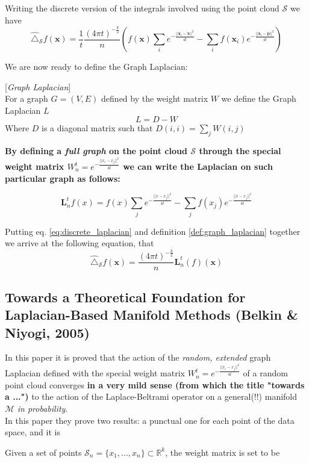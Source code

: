 Writing the discrete version of the integrals involved using the point cloud $\mathcal S$ we have
\begin{equation}\label{eq:discrete_laplacian}
	\hat \triangle_\mathcal S f(\mathbf x) =  \frac{1}{t} \frac{(4\pi t)^{-\frac{k}{2}}}{n}\left( f(\mathbf x)\sum_{i} e^{-\frac{||\mathbf x_i - \mathbf x||^2}{4t}} - \sum_{i} f(\mathbf x_i) e^{-\frac{||\mathbf x_i - \mathbf p||^2}{4t}}\right)
\end{equation}

We are now ready to define the Graph Laplacian:
\begin{definition}{[\textit{Graph Laplacian}]}\\
	For a graph $G = (V, E)$ defined by the weight matrix $W$ we define the Graph Laplacian $L$
	$$L = D-W$$
	Where $D$ is a diagonal matrix such that $D(i,i) = \sum_j W(i,j)$	
	\label{def:graph_laplacian}
\end{definition}
\textbf{By defining a \textit{full graph} on the point cloud $\mathcal S$ through the special weight matrix $W_n^t  = e^{-\frac{||x_i-x_j||^2}{4t}}$ we can write the Laplacian on such particular graph as follows:}
	
$$\mathbf L_n^tf(x) = f(x)\sum_{j}e^{-\frac{||x-x_j||^2}{4t}} - \sum_jf(x_j)e^{-\frac{||x-x_j||^2}{4t}}$$
	
Putting eq. \ref{eq:discrete_laplacian} and definition \ref{def:graph_laplacian} together we arrive at the following equation, that 
$$\hat \triangle_\mathcal S f(\mathbf x) =  \frac{(4\pi t)^{-\frac{k}{2}}}{n} \mathbf L_n^t(f)(\mathbf x)$$



\subsection{Towards a Theoretical Foundation for Laplacian-Based Manifold Methods (Belkin \& Niyogi, 2005)}
In this paper it is proved that the action of the \textit{random, extended} graph Laplacian defined with the special weight matrix $W_n^t  = e^{-\frac{||x_i-x_j||^2}{4t}}$ of a random point cloud converges \textbf{in a very mild sense (from which the title "towards a ...")} to the action of the Laplace-Beltrami operator on a general(!!) manifold $\mathcal M$ \textit{in probability}.\\
In this paper they prove two results: a punctual one for each point of the data space, and it is 

Given a set of points $\mathcal S_n = \{x_1, ..., x_n\} \subset \mathbb R^k$, the weight matrix is set to be 

